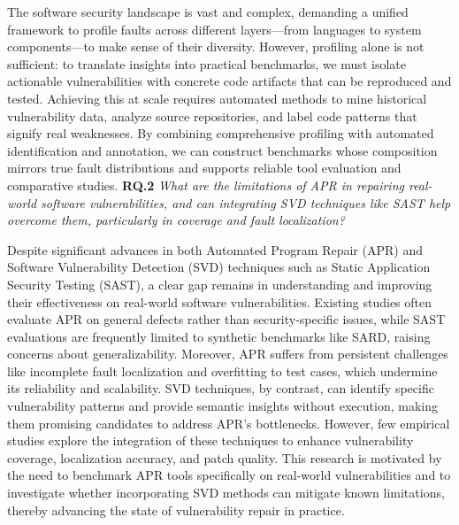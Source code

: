 The software security landscape is vast and complex, demanding a unified framework to profile faults across different layers—from languages to system components—to make sense of their diversity. However, profiling alone is not sufficient: to translate insights into practical benchmarks, we must isolate actionable vulnerabilities with concrete code artifacts that can be reproduced and tested. Achieving this at scale requires automated methods to mine historical vulnerability data, analyze source repositories, and label code patterns that signify real weaknesses. By combining comprehensive profiling with automated identification and annotation, we can construct benchmarks whose composition mirrors true fault distributions and supports reliable tool evaluation and comparative studies.
\newline
\newline
\textbf{\footnotesize RQ.2} \textit{What are the limitations of APR in repairing real-world software vulnerabilities, and can integrating SVD techniques like SAST help overcome them, particularly in coverage and fault localization?}

Despite significant advances in both Automated Program Repair (APR) and Software Vulnerability Detection (SVD) techniques such as Static Application Security Testing (SAST), a clear gap remains in understanding and improving their effectiveness on real-world software vulnerabilities. Existing studies often evaluate APR on general defects rather than security-specific issues, while SAST evaluations are frequently limited to synthetic benchmarks like SARD, raising concerns about generalizability. Moreover, APR suffers from persistent challenges like incomplete fault localization and overfitting to test cases, which undermine its reliability and scalability. SVD techniques, by contrast, can identify specific vulnerability patterns and provide semantic insights without execution, making them promising candidates to address APR’s bottlenecks. However, few empirical studies explore the integration of these techniques to enhance vulnerability coverage, localization accuracy, and patch quality. This research is motivated by the need to benchmark APR tools specifically on real-world vulnerabilities and to investigate whether incorporating SVD methods can mitigate known limitations, thereby advancing the state of vulnerability repair in practice.
